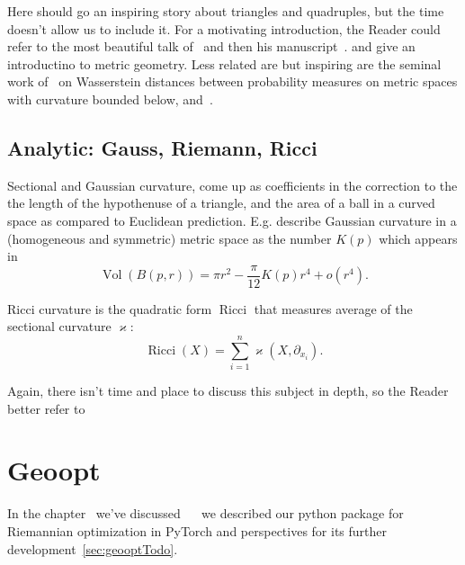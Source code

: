 Here should go an inspiring story about triangles and quadruples, but the time
doesn't allow us to include it.
For a motivating introduction, the Reader could refer to the most beautiful
talk of~\citet{villaniTriangles} and then his manuscript~\cite{villaniOldNew}.
\citet{burago} and \citet{alexander} give an introductino to metric geometry.
Less related are but inspiring are the seminal work of~\citet{sturm} on Wasserstein
distances between probability measures on metric spaces with curvature bounded
below, and~\citet{le2017existence}.

\subsection*{Analytic: Gauss, Riemann, Ricci}

Sectional and Gaussian curvature, come up as coefficients in the correction to
the the length of the hypothenuse of a triangle, and the area of a ball in a
curved space as compared to Euclidean prediction.
E.g. \citet{burago} describe Gaussian curvature in a (homogeneous and
symmetric) metric space as the number \( K(p) \) which appears in
\[ \operatorname{Vol}(B(p, r)) = \pi r^2 - \frac{\pi}{12}K(p) r^4 + o(r^4). \]

Ricci curvature is the quadratic form \( \operatorname{Ricci} \) that measures
average of the sectional curvature \( \varkappa \):
\[ \operatorname{Ricci}(X) = \sum_{i=1}^n \varkappa(X, \partial_{x_i}). \]

Again, there isn't time and place to discuss this subject in depth,
so the Reader better refer to~\citet{leeRiem}

\section{Geoopt}

In the chapter~ we've discussed
~~\cite{geoopt} we described our python package for
Riemannian optimization in PyTorch and perspectives for its further
development~\autoref{sec:geooptTodo}.
